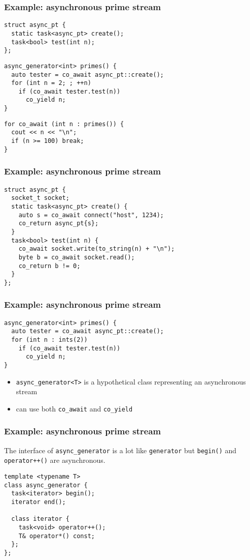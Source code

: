 \documentclass[aspectratio=43]{beamer}
\begin{document}
\begin{frame}[fragile]
  \frametitle{Example: asynchronous prime stream}
\begin{lstlisting}
struct async_pt {
  static task<async_pt> create();
  task<bool> test(int n);
};
\end{lstlisting}
\begin{lstlisting}
async_generator<int> primes() {
  auto tester = co_await async_pt::create();
  for (int n = 2; ; ++n)
    if (co_await tester.test(n))
      co_yield n;
}
\end{lstlisting}
\begin{lstlisting}
for co_await (int n : primes()) {
  cout << n << "\n";
  if (n >= 100) break;
}
\end{lstlisting}
\end{frame}

\begin{frame}[fragile]
  \frametitle{Example: asynchronous prime stream}
\begin{lstlisting}
struct async_pt {
  socket_t socket;
  static task<async_pt> create() {
    auto s = co_await connect("host", 1234);
    co_return async_pt{s};
  }
  task<bool> test(int n) {
    co_await socket.write(to_string(n) + "\n");
    byte b = co_await socket.read();
    co_return b != 0;
  }
};
\end{lstlisting}
\end{frame}

\begin{frame}[fragile]
  \frametitle{Example: asynchronous prime stream}
\begin{lstlisting}
async_generator<int> primes() {
  auto tester = co_await async_pt::create();
  for (int n : ints(2))
    if (co_await tester.test(n))
      co_yield n;
}
\end{lstlisting}
  \begin{itemize}
  \item \lstinline~async_generator<T>~ is a hypothetical class representing an
    asynchronous stream
  \item can use both \lstinline~co_await~ and \lstinline~co_yield~
  \end{itemize}
\end{frame}

\begin{frame}[fragile]
  \frametitle{Example: asynchronous prime stream}
  The interface of \lstinline~async_generator~ is a lot like
  \lstinline~generator~ but \lstinline~begin()~ and \lstinline~operator++()~ are
  asynchronous.
\begin{lstlisting}
template <typename T>
class async_generator {
  task<iterator> begin();
  iterator end();

  class iterator {
    task<void> operator++();
    T& operator*() const;
  };
};
\end{lstlisting}
\end{frame}
\end{document}
